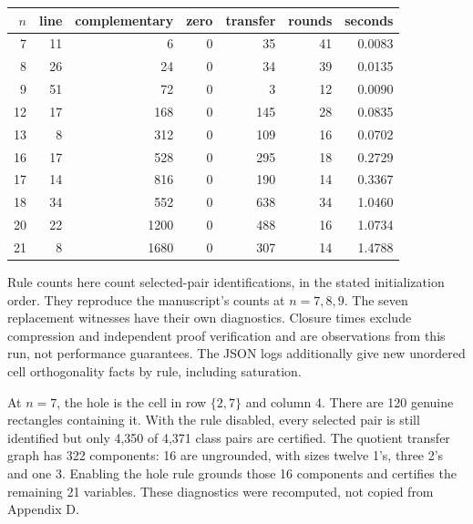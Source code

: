 \documentclass[11pt]{article}
\begin{document}
\begin{center}
\begin{tabular}{rrrrrrr}
\toprule
$n$ & line & complementary & zero & transfer & rounds & seconds\\
\midrule
7 & 11 & 6 & 0 & 35 & 41 & 0.0083 \\
8 & 26 & 24 & 0 & 34 & 39 & 0.0135 \\
9 & 51 & 72 & 0 & 3 & 12 & 0.0090 \\
12 & 17 & 168 & 0 & 145 & 28 & 0.0835 \\
13 & 8 & 312 & 0 & 109 & 16 & 0.0702 \\
16 & 17 & 528 & 0 & 295 & 18 & 0.2729 \\
17 & 14 & 816 & 0 & 190 & 14 & 0.3367 \\
18 & 34 & 552 & 0 & 638 & 34 & 1.0460 \\
20 & 22 & 1200 & 0 & 488 & 16 & 1.0734 \\
21 & 8 & 1680 & 0 & 307 & 14 & 1.4788 \\
\bottomrule
\end{tabular}
\end{center}
Rule counts here count selected-pair identifications, in the stated
initialization order. They reproduce the manuscript's counts at $n=7,8,9$.
The seven replacement witnesses have their own diagnostics. Closure times
exclude compression and independent proof verification and are observations
from this run, not performance guarantees. The JSON logs additionally give
new unordered cell orthogonality facts by rule, including saturation.

At $n=7$, the hole is the cell in row $\{2,7\}$ and column 4. There are
120 genuine rectangles containing it. With the rule disabled, every selected
pair is still identified but only 4,350 of 4,371 class pairs are certified.
The quotient transfer graph has 322 components: 16 are ungrounded, with
sizes twelve 1's, three 2's and one 3. Enabling the hole rule grounds those
16 components and certifies the remaining 21 variables. These diagnostics
were recomputed, not copied from Appendix D.

\newpage
\end{document}
